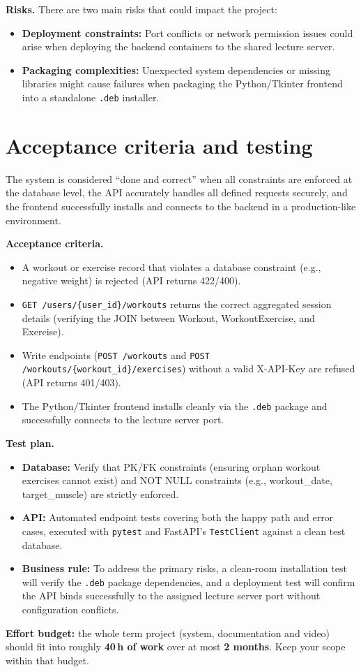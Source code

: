 \documentclass[11pt,a4paper]{article}
\begin{document}
\textbf{Risks.} 
There are two main risks that could impact the project:
\begin{itemize}
  \item \textbf{Deployment constraints:} Port conflicts or network permission issues could arise when deploying the backend containers to the shared lecture server.
  \item \textbf{Packaging complexities:} Unexpected system dependencies or missing libraries might cause failures when packaging the Python/Tkinter frontend into a standalone \texttt{.deb} installer.
\end{itemize}



\section{Acceptance criteria and testing}

The system is considered ``done and correct'' when all constraints are enforced at the database level, the API accurately handles all defined requests securely, and the frontend successfully installs and connects to the backend in a production-like environment.

\textbf{Acceptance criteria.} 
\begin{itemize}[topsep=2pt]
  \item A workout or exercise record that violates a database constraint (e.g., negative weight) is rejected (API returns 422/400).
  \item \texttt{GET /users/\{user\_id\}/workouts} returns the correct aggregated session details (verifying the JOIN between Workout, WorkoutExercise, and Exercise).
  \item Write endpoints (\texttt{POST /workouts} and \texttt{POST /workouts/\{workout\_id\}/exercises}) without a valid X-API-Key are refused (API returns 401/403).
  \item The Python/Tkinter frontend installs cleanly via the \texttt{.deb} package and successfully connects to the lecture server port.
\end{itemize}

\textbf{Test plan.} 
\begin{itemize}[topsep=2pt]
  \item \textbf{Database:} Verify that PK/FK constraints (ensuring orphan workout exercises cannot exist) and NOT NULL constraints (e.g., workout\_date, target\_muscle) are strictly enforced.
  \item \textbf{API:} Automated endpoint tests covering both the happy path and error cases, executed with \texttt{pytest} and FastAPI's \texttt{TestClient} against a clean test database.
  \item \textbf{Business rule:} To address the primary risks, a clean-room installation test will verify the \texttt{.deb} package dependencies, and a deployment test will confirm the API binds successfully to the assigned lecture server port without configuration conflicts.
\end{itemize}

\vspace{1em}
\begin{infobox}
\textbf{Effort budget:} the whole term project (system, documentation and video)
should fit into roughly \textbf{40\,h of work} over at most \textbf{2 months}.
Keep your scope within that budget.
\end{infobox}
\end{document}
